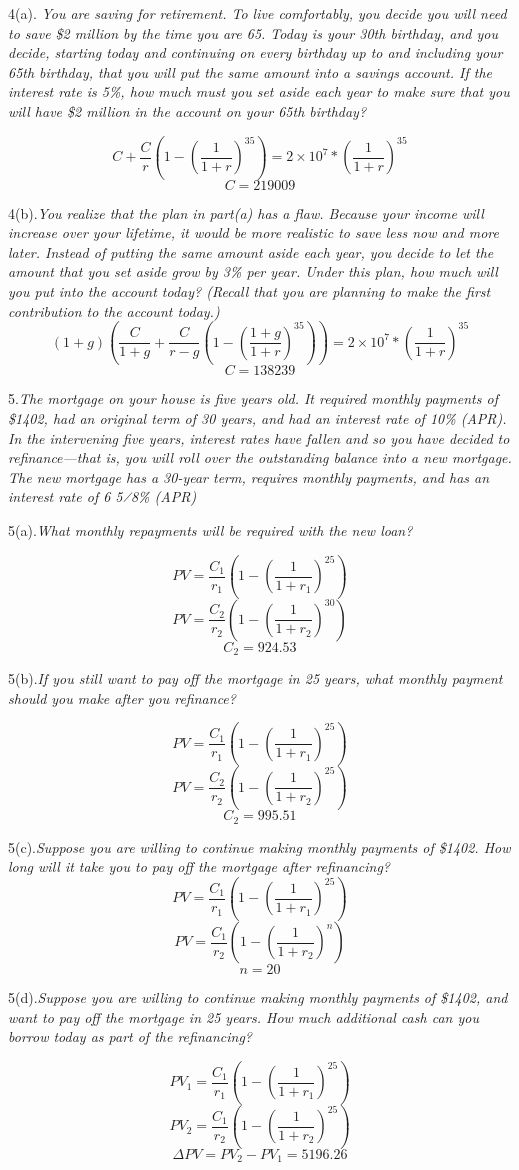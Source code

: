 \documentclass[10pt, a4paper]{article}
\begin{document}
4(a). \emph{You are saving for retirement. To live comfortably, you decide you will need to save \$2 million by the time you are 65. Today is your 30th birthday, and you decide, starting today and continuing on every birthday up to and including your 65th birthday, that you will put the same amount into a savings account. If the interest rate is 5\%, how much must you set aside each year to make sure that you will have \$2 million in the account on your 65th birthday?}

$$C + \frac{C}{r}(1 - (\frac{1}{1 + r})^{35}) = 2\times 10^7 * (\frac{1}{1 + r})^{35}$$
$$C = 219009$$

4(b).\emph{You realize that the plan in part(a) has a flaw. Because your income will increase over your lifetime, it would be more realistic to save less now and more later. Instead of putting the same amount aside each year, you decide to let the amount that you set aside grow by 3\% per year. Under this plan, how much will you put into the account today? (Recall that you are planning to make the first contribution to the account today.)}
$$(1 + g)(\frac{C}{1 + g} + \frac{C}{r - g}(1 - (\frac{1 + g}{1 + r})^{35})) = 2 \times 10^7 * (\frac{1}{1 + r})^{35}$$
$$C = 138239$$
\medskip

5.\emph{The mortgage on your house is five years old. It required monthly payments of \$1402, had an original term of 30 years, and had an interest rate of 10\% (APR). In the intervening five years, interest rates have fallen and so you have decided to refinance—that is, you will roll over the outstanding balance into a new mortgage. The new mortgage has a 30-year term, requires monthly payments, and has an interest rate of 6 5⁄8\% (APR)}

5(a).\emph{What monthly repayments will be required with the new loan?}

$$PV = \frac{C_1}{r_1}(1 - (\frac{1}{1 + r_1})^{25})$$
$$PV = \frac{C_2}{r_2}(1 - (\frac{1}{1 + r_2})^{30})$$
$$C_2 = 924.53$$

5(b).\emph{If you still want to pay off the mortgage in 25 years, what monthly payment should you make after you refinance?}

$$PV = \frac{C_1}{r_1}(1 - (\frac{1}{1 + r_1})^{25})$$
$$PV = \frac{C_2}{r_2}(1 - (\frac{1}{1 + r_2})^{25})$$
$$C_2 = 995.51$$

5(c).\emph{Suppose you are willing to continue making monthly payments of \$1402. How long will it take you to pay off the mortgage after refinancing?}
$$PV = \frac{C_1}{r_1}(1 - (\frac{1}{1 + r_1})^{25})$$
$$PV = \frac{C_1}{r_2}(1 - (\frac{1}{1 + r_2})^{n})$$
$$n = 20$$

5(d).\emph{Suppose you are willing to continue making monthly payments of \$1402, and want to pay off the mortgage in 25 years. How much additional cash can you borrow today as part of the refinancing?}

$$PV_1 = \frac{C_1}{r_1}(1 - (\frac{1}{1 + r_1})^{25})$$
$$PV_2 = \frac{C_1}{r_2}(1 - (\frac{1}{1 + r_2})^{25})$$
$$\Delta PV = PV_2 - PV_1 = 5196.26$$
\end{document}
